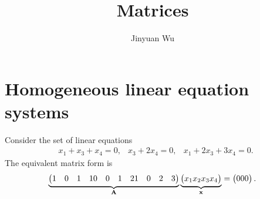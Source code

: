 \documentclass[hyperref, a4paper]{article}
\title{Matrices}
\author{Jinyuan Wu}
\def\\{}%
\newcommand*{\mat}[1]{\vb{#1}}
\begin{document}
\maketitle

\section{Homogeneous linear equation systems}\label{sec:linear-eq}

Consider the set of linear equations 
\begin{equation}
    \begin{aligned}
        &x_1 + x_3 + x_4 = 0, \\
        &x_3 + 2 x_4 = 0, \\
        &x_1 + 2 x_3 + 3 x_4 = 0.
    \end{aligned}
\end{equation}
The equivalent matrix form is 
\begin{equation}
    \underbrace{\pmqty{
        1 & 0 & 1 & 1 \\
        0 & 0 & 1 & 2 \\
        1 & 0 & 2 & 3
    }}_{\mat{A}} \underbrace{\pmqty{x_1 \\ x_2 \\ x_3 \\ x_4}}_{\vb{x}} = \pmqty{0 \\ 0 \\ 0}.
\end{equation}
\end{document}
